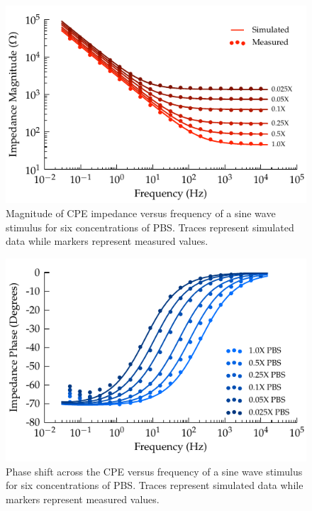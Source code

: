 \documentclass[10pt,final,journal]{IEEEtran}
\begin{document}
\begin{figure}
    \begin{center}
        \includegraphics{graphics/displacement_impedanceVsFrequency_magnitude}
    \end{center}
    \caption{Magnitude of CPE impedance versus frequency of a sine wave stimulus for six concentrations of PBS. Traces represent simulated data while markers represent measured values.}
    \label{fig:CPE_Magnitude}
\end{figure}

\begin{figure}
    \begin{center}
        \includegraphics{graphics/displacement_impedanceVsFrequency_phase}
    \end{center}
    \caption{Phase shift across the CPE versus frequency of a sine wave stimulus for six concentrations of PBS. Traces represent simulated data while markers represent measured values.}
    \label{fig:CPE_Phase}
\end{figure}
\end{document}
